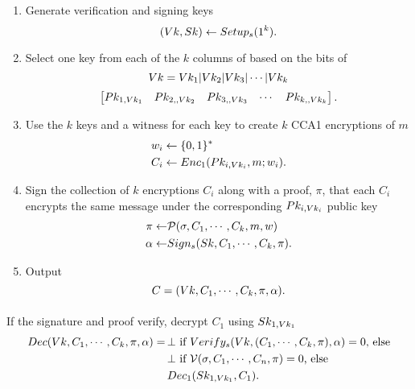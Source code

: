 \begin{enumerate}
\item Generate verification and signing keys
\[
(Vk, Sk) \leftarrow Setup_s(1^k).
\]

\item Select one key from each of the $k$ columns of \Pk based on the bits of \Vk
\[
Vk = Vk_1 | Vk_2  | Vk_3 |  \cdots  | Vk_k  \\
\]
\[
\begin{bmatrix}
Pk_{1,Vk_1}  & Pk_{2,,Vk_2}  & Pk_{3,,Vk_3}  & \cdots  & Pk_{k,,Vk_k}  \\
\end{bmatrix}.
\]

\item Use the $k$ keys and a witness for each key to create $k$ CCA1 encryptions of $m$
\begin{align*}
w_i & \leftarrow \{0,1\}^* \\ %
C_i & \leftarrow \Enc_1(\Pk_{i,\Vk_i}, m; w_i).
\end{align*}

\item Sign the collection of $k$ encryptions  $C_i$ along with a proof, $\pi$, that each $C_i$ encrypts the same message under the corresponding $Pk_{i,Vk_i}$ public key
\begin{align*}
\pi   \leftarrow & \mathcal{P}(\sigma, C_1, \cdots, C_k, m, w) \\
\alpha \leftarrow & Sign_s(Sk, C_1, \cdots, C_k, \pi).
\end{align*}


\item Output
\[
  C = (Vk, C_1, \cdots, C_k, \pi, \alpha).
\]

\end{enumerate}

\paragraph{\Dec}
If the signature and proof verify, decrypt $C_1$ using $Sk_{1, Vk_1}$
\begin{align*}
Dec(Vk, C_1, \cdots, C_k, \pi, \alpha) = \,
&\bot \text{ if } Verify_s(Vk, (C_1, \cdots, C_k, \pi), \alpha) = 0 \text{, else} \\
&\bot \text{ if } \mathcal{V}(\sigma, C_1, \cdots, C_n, \pi) = 0 \text{, else} \\
&Dec_1(Sk_{1,Vk_1}, C_1). \\
\end{align*}

